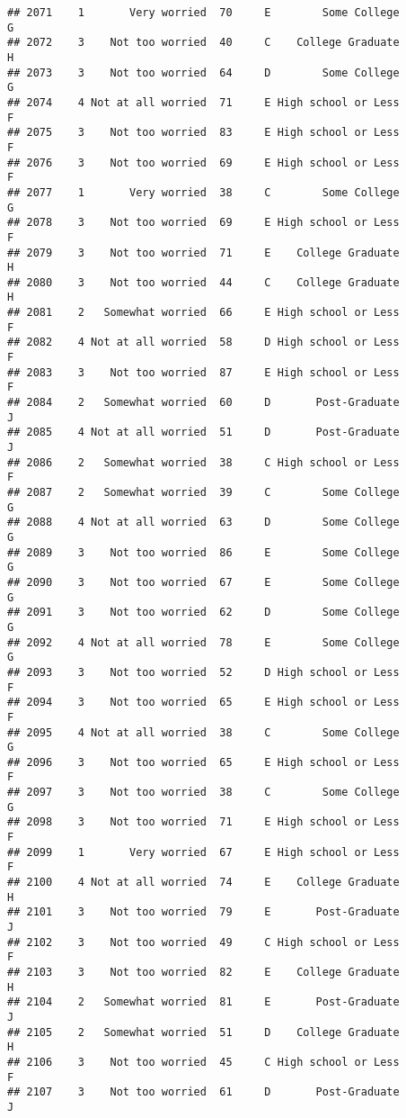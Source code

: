 \documentclass[
]{article}
\begin{document}
\begin{verbatim}
## 2071    1       Very worried  70     E        Some College         G
## 2072    3    Not too worried  40     C    College Graduate         H
## 2073    3    Not too worried  64     D        Some College         G
## 2074    4 Not at all worried  71     E High school or Less         F
## 2075    3    Not too worried  83     E High school or Less         F
## 2076    3    Not too worried  69     E High school or Less         F
## 2077    1       Very worried  38     C        Some College         G
## 2078    3    Not too worried  69     E High school or Less         F
## 2079    3    Not too worried  71     E    College Graduate         H
## 2080    3    Not too worried  44     C    College Graduate         H
## 2081    2   Somewhat worried  66     E High school or Less         F
## 2082    4 Not at all worried  58     D High school or Less         F
## 2083    3    Not too worried  87     E High school or Less         F
## 2084    2   Somewhat worried  60     D       Post-Graduate         J
## 2085    4 Not at all worried  51     D       Post-Graduate         J
## 2086    2   Somewhat worried  38     C High school or Less         F
## 2087    2   Somewhat worried  39     C        Some College         G
## 2088    4 Not at all worried  63     D        Some College         G
## 2089    3    Not too worried  86     E        Some College         G
## 2090    3    Not too worried  67     E        Some College         G
## 2091    3    Not too worried  62     D        Some College         G
## 2092    4 Not at all worried  78     E        Some College         G
## 2093    3    Not too worried  52     D High school or Less         F
## 2094    3    Not too worried  65     E High school or Less         F
## 2095    4 Not at all worried  38     C        Some College         G
## 2096    3    Not too worried  65     E High school or Less         F
## 2097    3    Not too worried  38     C        Some College         G
## 2098    3    Not too worried  71     E High school or Less         F
## 2099    1       Very worried  67     E High school or Less         F
## 2100    4 Not at all worried  74     E    College Graduate         H
## 2101    3    Not too worried  79     E       Post-Graduate         J
## 2102    3    Not too worried  49     C High school or Less         F
## 2103    3    Not too worried  82     E    College Graduate         H
## 2104    2   Somewhat worried  81     E       Post-Graduate         J
## 2105    2   Somewhat worried  51     D    College Graduate         H
## 2106    3    Not too worried  45     C High school or Less         F
## 2107    3    Not too worried  61     D       Post-Graduate         J

\end{verbatim}
\end{document}
